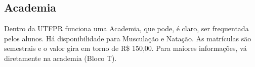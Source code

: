 \documentclass[a4paper,12pt,openany]{article}
\begin{document}
\subsection{Academia}

Dentro da UTFPR funciona uma Academia, que pode, é claro, ser frequentada pelos alunos. Há disponibilidade para Musculação e Natação. As matrículas são semestrais e o valor gira em torno de R\$ 150,00. Para maiores informações, vá diretamente na academia (Bloco T).








\newpage
\end{document}
